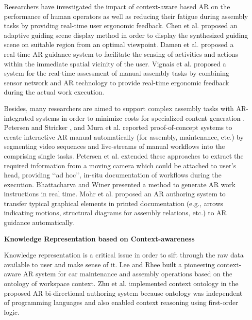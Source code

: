 \documentclass[fyp]{socreport}
\begin{document}
Researchers have investigated the impact of context-aware based AR on the performance of human operators as well as reducing their fatigue during assembly tasks by providing real-time user ergonomic feedback. Chen et al. \cite{chen2015automated} proposed an adaptive guiding scene display method in order to display the synthesized guiding scene on suitable region from an optimal viewpoint. Damen et al. \cite{damen2012egocentric} proposed a real-time AR guidance system to facilitate the sensing of activities and actions within the immediate spatial vicinity of the user. Vignais et al. \cite{vignais2013innovative} proposed a system for the real-time assessment of manual assembly tasks by combining sensor network and AR technology to provide real-time ergonomic feedback during the actual work execution.

Besides, many researchers are aimed to support complex assembly tasks with AR-integrated systems in order to minimize costs for specialized content generation \cite{servan2012using}. Petersen and Stricker \cite{petersen2012learning}, and Mura et al. \cite{mura2013ibes} reported proof-of-concept systems to create interactive AR manual automatically (for assembly, maintenance, etc.) by segmenting video sequences and live-streams of manual workflows into the comprising single tasks. Petersen et al. \cite{petersen2013real} extended these approaches to extract the required information from a moving camera which could be attached to user’s head, providing ‘‘ad hoc’’, in-situ documentation of workflows during the execution. Bhattacharva and Winer \cite{bhattacharya2015method} presented a method to generate AR work instructions in real time. Mohr et al. \cite{mohr2015retargeting} proposed an AR authoring system to transfer typical graphical elements in printed documentation (e.g., arrows indicating motions, structural diagrams for assembly relations, etc.) to AR guidance automatically.

\textbf{Knowledge Representation based on Context-awareness}

Knowledge representation is a critical issue in order to sift through the raw data available to user and make sense of it. Lee and Rhee \cite{lee2008context} built a pioneering context-aware AR system for car maintenance and assembly operations based on the ontology of workspace context. Zhu et al. \cite{zhu2013authorable} implemented context ontology in the proposed AR bi-directional authoring system because ontology was independent of programming languages and also enabled context reasoning using first-order logic.
\end{document}
